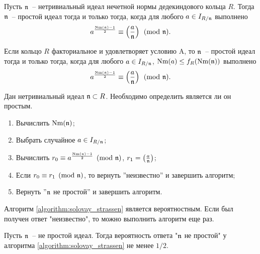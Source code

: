 \documentclass[_00_autoref.tex]{subfiles}
\begin{document}
\begin{theorem}\label{theorem:euler_criteria}
    Пусть $\mathfrak{n}$~-- нетривиальный идеал нечетной нормы дедекиндового кольца $R$.
    Тогда $\mathfrak{n}$~-- простой идеал тогда и только тогда, когда для любого $a \in I_{R/\mathfrak{n}}$ выполнено
    \begin{equation*}
        a^{\frac{\textrm{Nm}(\mathfrak{n}) - 1}{2}} \equiv \left(\frac{a}{\mathfrak{n}}\right) \pmod{\mathfrak{n}}.
    \end{equation*}

    Если кольцо $R$ факториальное и удовлетворяет условию A, то $\mathfrak{n}$~-- простой идеал тогда и только тогда, когда для любого $a \in I_{R/\mathfrak{n}}$, $\textrm{Nm}(a) \le f_R(\textrm{Nm}(\mathfrak{n}))$ выполнено
    \begin{equation*}
        a^{\frac{\textrm{Nm}(\mathfrak{n}) - 1}{2}} \equiv \left(\frac{a}{\mathfrak{n}}\right) \pmod{\mathfrak{n}}.
    \end{equation*}
\end{theorem}

\begin{algorithm}\label{algorithm:solovay_strassen}
    Дан нетривиальный идеал $\mathfrak{n} \subset R$.
    Необходимо определить является ли он простым.

    \begin{enumerate}
        \item Вычислить $\textrm{Nm}(\mathfrak{n})$;
        
        \item Выбрать случайное $a \in I_{R/\mathfrak{n}}$;

        \item Вычислить $r_0 \equiv a^{\frac{\textrm{Nm}(\mathfrak{n}) - 1}{2}} \pmod{\mathfrak{n}}$, $r_1 = \left(\frac{a}{\mathfrak{n}}\right)$;

        \item Если $r_0 \equiv r_1 \pmod{\mathfrak{n}}$, то вернуть ''неизвестно'' и завершить алгоритм;

        \item Вернуть ''$\mathfrak{n}$ не простой'' и завершить алгоритм.
    \end{enumerate}
\end{algorithm}

\begin{remark}
    Алгоритм \ref{algorithm:solovay_strassen} является вероятностным.
    Если был получен ответ "неизвестно", то можно выполнить алгоритм еще раз.
\end{remark}

\begin{proposition}
    Пусть $\mathfrak{n}$~-- не простой идеал.
    Тогда вероятность ответа "$\mathfrak{n}$ не простой" у алгоритма \ref{algorithm:solovay_strassen} не менее $1/2$.
\end{proposition}
\end{document}
